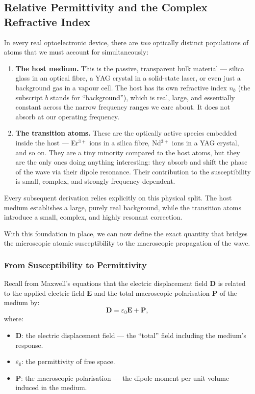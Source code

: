 \subsection{Relative Permittivity and the Complex Refractive Index}

In every real optoelectronic device, there are \textit{two} optically distinct populations of atoms that we must account for simultaneously:

\begin{enumerate}
    \item \textbf{The host medium.} This is the passive, transparent bulk material — silica glass in an optical fibre, a YAG crystal in a solid-state laser, or even just a background gas in a vapour cell. The host has its own refractive index $n_b$ (the subscript $b$ stands for ``background''), which is real, large, and essentially constant across the narrow frequency ranges we care about. It does not absorb at our operating frequency.
    \item \textbf{The transition atoms.} These are the optically active species embedded inside the host — Er$^{3+}$ ions in a silica fibre, Nd$^{3+}$ ions in a YAG crystal, and so on. They are a tiny minority compared to the host atoms, but they are the only ones doing anything interesting: they absorb and shift the phase of the wave via their dipole resonance. Their contribution to the susceptibility is small, complex, and strongly frequency-dependent.
\end{enumerate}

Every subsequent derivation relies explicitly on this physical split. The host medium establishes a large, purely real background, while the transition atoms introduce a small, complex, and highly resonant correction.

With this foundation in place, we can now define the exact quantity that bridges the microscopic atomic susceptibility to the macroscopic propagation of the wave.

\subsubsection{From Susceptibility to Permittivity}

Recall from Maxwell's equations that the electric displacement field $\mathbf{D}$ is related to the applied electric field $\mathbf{E}$ and the total macroscopic polarisation $\mathbf{P}$ of the medium by:
\begin{equation*}
    \mathbf{D} = \varepsilon_0 \mathbf{E} + \mathbf{P},
\end{equation*}
where:
\begin{itemize}
    \item $\mathbf{D}$: the electric displacement field — the ``total'' field including the medium's response.
    \item $\varepsilon_0$: the permittivity of free space.
    \item $\mathbf{P}$: the macroscopic polarisation — the dipole moment per unit volume induced in the medium.
\end{itemize}

